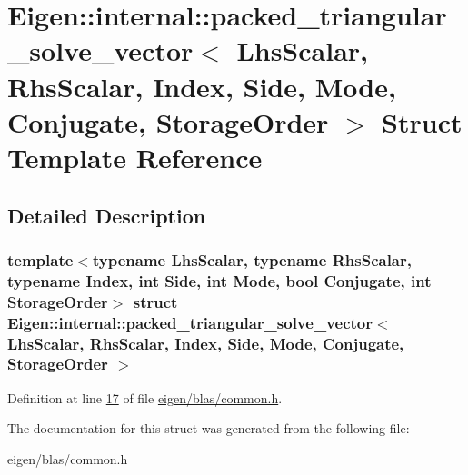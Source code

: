 \hypertarget{struct_eigen_1_1internal_1_1packed__triangular__solve__vector}{}\section{Eigen\+:\+:internal\+:\+:packed\+\_\+triangular\+\_\+solve\+\_\+vector$<$ Lhs\+Scalar, Rhs\+Scalar, Index, Side, Mode, Conjugate, Storage\+Order $>$ Struct Template Reference}
\label{struct_eigen_1_1internal_1_1packed__triangular__solve__vector}


\subsection{Detailed Description}
\subsubsection*{template$<$typename Lhs\+Scalar, typename Rhs\+Scalar, typename Index, int Side, int Mode, bool Conjugate, int Storage\+Order$>$\newline
struct Eigen\+::internal\+::packed\+\_\+triangular\+\_\+solve\+\_\+vector$<$ Lhs\+Scalar, Rhs\+Scalar, Index, Side, Mode, Conjugate, Storage\+Order $>$}



Definition at line \hyperlink{eigen_2blas_2common_8h_source_l00017}{17} of file \hyperlink{eigen_2blas_2common_8h_source}{eigen/blas/common.\+h}.



The documentation for this struct was generated from the following file\+:\begin{DoxyCompactItemize}
\item 
eigen/blas/common.\+h\end{DoxyCompactItemize}
